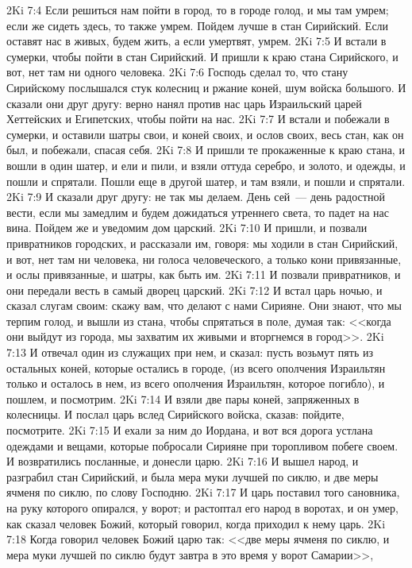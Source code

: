 \vs 2Ki 7:4 Если решиться нам пойти в город, то в городе голод, и мы там умрем; если же сидеть здесь, то также умрем. Пойдем лучше в стан Сирийский. Если оставят нас в живых, будем жить, а если умертвят, умрем.
\vs 2Ki 7:5 И встали в сумерки, чтобы пойти в стан Сирийский. И пришли к краю стана Сирийского, и вот, нет там ни одного человека.
\vs 2Ki 7:6 Господь сделал то, что стану Сирийскому послышался стук колесниц и ржание коней, шум войска большого. И сказали они друг другу: верно нанял против нас царь Израильский царей Хеттейских и Египетских, чтобы пойти на нас.
\vs 2Ki 7:7 И встали и побежали в сумерки, и оставили шатры свои, и коней своих, и ослов своих, весь стан, как он был, и побежали, спасая себя.
\vs 2Ki 7:8 И пришли те прокаженные к краю стана, и вошли в один шатер, и ели и пили, и взяли оттуда серебро, и золото, и одежды, и пошли и спрятали. Пошли еще в другой шатер, и там взяли, и пошли и спрятали.
\vs 2Ki 7:9 И сказали друг другу: не так мы делаем. День сей~--- день радостной вести, если мы замедлим и будем дожидаться утреннего света, то падет на нас вина. Пойдем же и уведомим дом царский.
\vs 2Ki 7:10 И пришли, и позвали привратников городских, и рассказали им, говоря: мы ходили в стан Сирийский, и вот, нет там ни человека, ни голоса человеческого, а только кони привязанные, и ослы привязанные, и шатры, как быть им.
\vs 2Ki 7:11 И позвали привратников, и они передали весть в самый дворец царский.
\vs 2Ki 7:12 И встал царь ночью, и сказал слугам своим: скажу вам, что делают с нами Сирияне. Они знают, что мы терпим голод, и вышли из стана, чтобы спрятаться в поле, думая так: <<когда они выйдут из города, мы захватим их живыми и вторгнемся в город>>.
\vs 2Ki 7:13 И отвечал один из служащих при нем, и сказал: пусть возьмут пять из остальных коней, которые остались в городе, (из всего ополчения Израильтян только и осталось в нем, из всего ополчения Израильтян, которое погибло), и пошлем, и посмотрим.
\vs 2Ki 7:14 И взяли две пары коней, запряженных в колесницы. И послал царь вслед Сирийского войска, сказав: пойдите, посмотрите.
\vs 2Ki 7:15 И ехали за ним до Иордана, и вот вся дорога устлана одеждами и вещами, которые побросали Сирияне при торопливом побеге своем. И возвратились посланные, и донесли царю.
\vs 2Ki 7:16 И вышел народ, и разграбил стан Сирийский, и была мера муки лучшей по сиклю, и две меры ячменя по сиклю, по слову Господню.
\vs 2Ki 7:17 И царь поставил того сановника, на руку которого опирался, у ворот; и растоптал его народ в воротах, и он умер, как сказал человек Божий, который говорил, когда приходил к нему царь.
\vs 2Ki 7:18 Когда говорил человек Божий царю так: <<две меры ячменя по сиклю, и мера муки лучшей по сиклю будут завтра в это время у ворот Самарии>>,
